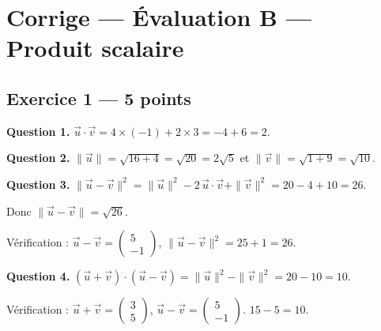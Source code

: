 
\section*{Corrige — Évaluation B — Produit scalaire}

\subsection*{Exercice 1 — 5 points}


\textbf{Question 1.}
$\vec{u} \cdot \vec{v} = 4 \times (-1) + 2 \times 3 = -4 + 6 = 2$.

\textbf{Question 2.}
$\|\vec{u}\| = \sqrt{16 + 4} = \sqrt{20} = 2\sqrt{5}$ et $\|\vec{v}\| = \sqrt{1 + 9} = \sqrt{10}$.

\textbf{Question 3.}
$\|\vec{u} - \vec{v}\|^2 = \|\vec{u}\|^2 - 2\,\vec{u} \cdot \vec{v} + \|\vec{v}\|^2 = 20 - 4 + 10 = 26$.

Donc $\|\vec{u} - \vec{v}\| = \sqrt{26}$.

Vérification : $\vec{u} - \vec{v} = \begin{pmatrix} 5 \\ -1 \end{pmatrix}$, $\|\vec{u} - \vec{v}\|^2 = 25 + 1 = 26$. \checkmark

\textbf{Question 4.}
$(\vec{u} + \vec{v}) \cdot (\vec{u} - \vec{v}) = \|\vec{u}\|^2 - \|\vec{v}\|^2 = 20 - 10 = 10$.

Vérification : $\vec{u} + \vec{v} = \begin{pmatrix} 3 \\ 5 \end{pmatrix}$, $\vec{u} - \vec{v} = \begin{pmatrix} 5 \\ -1 \end{pmatrix}$. $15 - 5 = 10$. \checkmark

